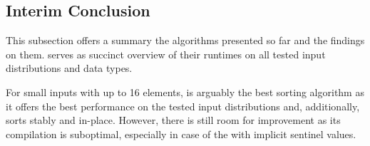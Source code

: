 \subsection{Interim Conclusion}
\label{subsec:tasklet:conclusion}


This subsection offers a summary the algorithms presented so far and the findings on them.
 serves as succinct overview of their runtimes on all tested input distributions and data types.

For small inputs with up to 16 elements, \IS{} is arguably the best sorting algorithm as it offers the best performance on the tested input distributions and, additionally, sorts stably and in-place.
However, there is still room for improvement as its compilation is suboptimal, especially in case of the \IS{} with implicit sentinel values.

